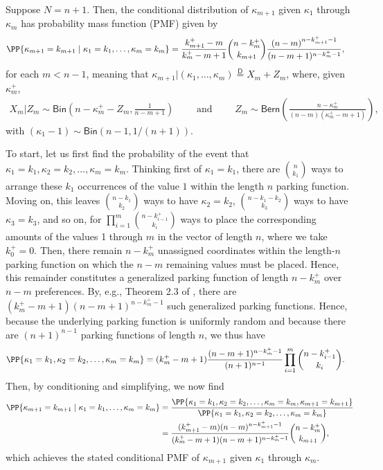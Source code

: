 \begin{lemma}\label{heldkappaCPMF1}
Suppose $N=n+1$. Then, the conditional distribution of $\kappa_{m+1}$ given $\kappa_1$ through $\kappa_m$ has probability mass function (PMF) given by
\begin{align}
\PP{\kappa_{m+1} = k_{m+1} \mid \kappa_1 = k_1, \dots, \kappa_m = k_m}
&=
\frac{k_{m+1}^+ - m}{k_m^+ - m + 1}
{n - k_m^+ \choose k_{m+1}}
\frac{\left(n-m\right)^{n-k_{m+1}^+-1}}{(n-m+1)^{n-k_m^+-1}}
,
\end{align}
for each $m < n - 1$, meaning that $\kappa_{m+1} | (\kappa_1, \dots, \kappa_m) \stackrel{\mathsf{D}}{=} X_m + Z_m$, where, given $\kappa_m^+$,
\begin{align}
X_m | Z_m
\sim 
\mathsf{Bin}\left(
n - \kappa_m^+ - Z_m
,
\frac{1}{n-m+1}
\right)
\qquad
\text{ and }
\qquad
Z_m \sim 
\mathsf{Bern}\left(\frac{n-\kappa_m^+}{(n-m)(\kappa_m^+ - m + 1)} \right)
,
\end{align}
with $(\kappa_1 - 1) \sim \mathsf{Bin}\left(n-1, 1/(n+1)\right)$.
\end{lemma}
To start, let us first find the probability of the event that $\kappa_1 = k_1, \kappa_2 = k_2, \dots, \kappa_m = k_m$. Thinking first of $\kappa_1 = k_1$, there are ${n \choose k_1}$ ways to arrange these $k_1$ occurrences of the value $1$ within the length $n$ parking function. Moving on, this leaves ${n - k_1 \choose k_2}$ ways to have $\kappa_2 = k_2$, ${n - k_1 - k_2 \choose k_3}$ ways to have $\kappa_3 = k_3$, and so on, for $\prod_{i=1}^m {n - k_{i-1}^+ \choose k_i}$ ways to place the corresponding amounts of the values 1 through $m$ in the vector of length $n$, where we take $k_0^+ = 0$. Then, there remain $n - k_m^+$ unassigned coordinates within the length-$n$ parking function on which the $n-m$ remaining values must be placed. Hence, this remainder constitutes a generalized parking function of length $n - k_m^+$ over $n-m$ preferences. By, e.g., Theorem 2.3 of \citet{kenyon2023parking}, there are $(k_m^+-m+1)(n-m+1)^{n - k_m^+-1}$ such generalized parking functions. Hence, because the underlying parking function is uniformly random and because there are $(n+1)^{n-1}$ parking functions of length $n$, we thus have
\begin{align}
\PP{\kappa_1 = k_1, \kappa_2 = k_2, \dots, \kappa_m = k_m}
&=
(k_m^+-m+1)
\frac{(n-m+1)^{n - k_m^+-1}}{(n+1)^{n-1}}
\prod_{i=1}^m {n - k_{i-1}^+ \choose k_i}
.
\end{align}
Then, by conditioning and simplifying, we now find
\begin{align}
\PP{\kappa_{m+1} = k_{m+1} \mid \kappa_1 = k_1, \dots, \kappa_m = k_m}
&=
\frac{\PP{\kappa_1 = k_1, \kappa_2 = k_2, \dots, \kappa_m = k_m, \kappa_{m+1} = k_{m+1}}}{\PP{\kappa_1 = k_1, \kappa_2 = k_2, \dots, \kappa_m = k_m}}
\\
&=
\frac{
(k_{m+1}^+-m)
(n-m)^{n - k_{m+1}^+-1}
}
{
(k_m^+-m+1)
(n-m+1)^{n - k_m^+-1}
}
{n - k_{m}^+ \choose k_{m+1}}
,
\end{align}
which achieves the stated conditional PMF of $\kappa_{m+1}$ given $\kappa_1$ through $\kappa_m$.


